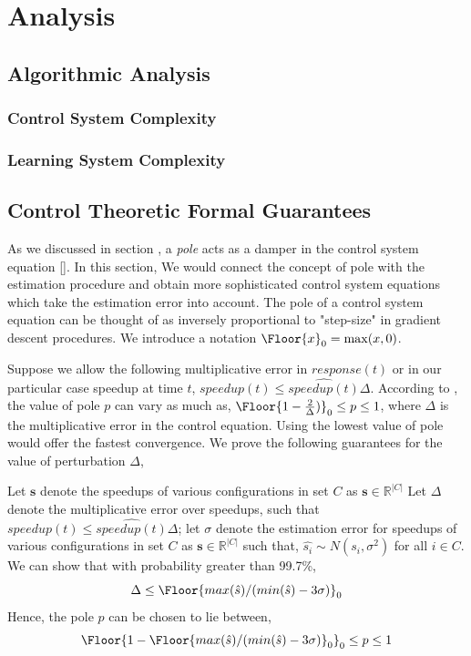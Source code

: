 \section{Analysis}
\subsection{Algorithmic Analysis}

\subsubsection{Control System Complexity}

\subsubsection{Learning System Complexity}

\subsection{Control Theoretic Formal Guarantees}
As we discussed in section \secref{}, a \emph{pole} acts as a damper in the control system equation \eqref{}. In this section, We would connect the concept of pole with the estimation procedure and obtain more sophisticated control system equations which take the estimation error into account.
The pole of a control system equation can be thought of as inversely proportional to "step-size" in gradient descent procedures. %
We introduce a notation $\Floor{x}_0 = \max(x,0)$.

Suppose we allow the following multiplicative error in $response(t)$ or in our particular case speedup at time $t$, $speedup(t) \leq  \hat{speedup(t)} \Delta$. According to \cite{}, the value of pole $p$ can vary as much as, $\Floor{1-\frac{2}{\Delta})}_0\leq p \leq 1$, where $\Delta$ is the multiplicative error in the control equation. Using the lowest value of pole would offer the fastest convergence. We prove the following guarantees for the value of perturbation $\Delta$,

\begin{theorem}
Let $\mathbf{s}$ denote the speedups of various configurations in set $C$ as $\mathbf{s} \in \mathbb{R}^{|C|}$ 
Let $\Delta$ denote the multiplicative error over speedups, such that $speedup(t) \leq \hat{speedup(t)}\Delta $; let $\sigma$ denote the estimation error for speedups of various configurations in set $C$ as $\mathbf{s} \in \mathbb{R}^{|C|}$ such that, $\hat{s_i} \sim N(s_i, \sigma^2)$ for all $i \in C$. We can show that with probability greater than 99.7\%, 
$$
\Delta \leq \Floor{max(\hat{s})/(min(\hat{s}) -  3\sigma)}_0
$$ 
Hence, the pole $p$ can be chosen to lie between, $$\Floor{1- \Floor{max(\hat{s})/(min(\hat{s}) -  3\sigma)}_0}_0 \leq p \leq 1$$
\end{theorem}

